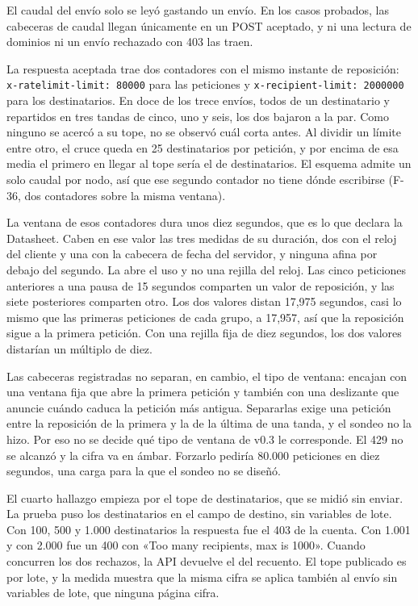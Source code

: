 El caudal del envío solo se leyó gastando un envío. En los casos probados, las
cabeceras de caudal llegan únicamente en un POST aceptado, y ni una lectura de
dominios ni un envío rechazado con 403 las traen.

La respuesta aceptada trae dos contadores con el mismo instante de reposición:
\texttt{x-ratelimit-limit: 80000} para las peticiones y
\texttt{x-recipient-limit: 2000000} para los destinatarios. En doce de los trece
envíos, todos de un destinatario y repartidos en tres tandas de cinco, uno y seis,
los dos bajaron a la par.
Como ninguno se acercó a su tope, no se observó cuál corta antes. Al dividir
un límite entre otro, el cruce queda en 25 destinatarios por petición, y por
encima de esa media el primero en llegar al tope sería el de destinatarios. El
esquema admite un solo caudal por nodo, así que ese segundo contador no tiene
dónde escribirse (F-36, dos contadores sobre la misma ventana).

La ventana de esos contadores dura unos diez segundos, que es lo que declara la
Datasheet. Caben en ese valor las tres medidas de su duración, dos con el reloj del cliente y
una con la cabecera de fecha del servidor, y ninguna afina por debajo del
segundo. La abre el uso y no una rejilla del reloj. Las cinco peticiones
anteriores a una pausa de 15 segundos comparten un valor de reposición, y las
siete posteriores comparten otro. Los dos valores distan 17,975 segundos, casi
lo mismo que las primeras peticiones de cada grupo, a 17,957, así que la
reposición sigue a la primera petición. Con una rejilla fija de diez segundos,
los dos valores distarían un múltiplo de diez.

Las cabeceras registradas no separan, en cambio, el tipo de ventana: encajan con una ventana
fija que abre la primera petición y también con una deslizante que anuncie
cuándo caduca la petición más antigua. Separarlas exige una petición entre la
reposición de la primera y la de la última de una tanda, y el sondeo no la hizo.
Por eso no se decide qué tipo de ventana de v0.3 le corresponde. El 429 no se
alcanzó y la cifra va en ámbar. Forzarlo pediría 80.000 peticiones en diez segundos, una carga para la que el sondeo no se diseñó.

El cuarto hallazgo empieza por el tope de destinatarios, que se midió sin enviar. La prueba puso los destinatarios
en el campo de destino, sin variables de lote. Con 100, 500 y 1.000
destinatarios la respuesta fue el 403 de la cuenta. Con 1.001 y con 2.000 fue un
400 con «Too many recipients, max is 1000». Cuando concurren los dos rechazos,
la API devuelve el del recuento. El tope publicado es por lote, y la medida
muestra que la misma cifra se aplica también al envío sin variables de lote, que
ninguna página cifra.

